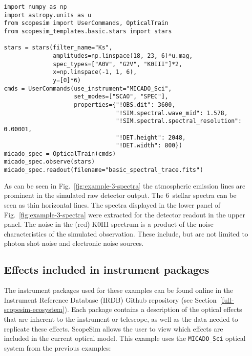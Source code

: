 \begin{lstlisting}[frame=single]
import numpy as np
import astropy.units as u
from scopesim import UserCommands, OpticalTrain
from scopesim_templates.basic.stars import stars

stars = stars(filter_name="Ks",
              amplitudes=np.linspace(18, 23, 6)*u.mag,
              spec_types=["A0V", "G2V", "K0III"]*2,
              x=np.linspace(-1, 1, 6),
              y=[0]*6)
cmds = UserCommands(use_instrument="MICADO_Sci",
                    set_modes=["SCAO", "SPEC"],
                    properties={"!OBS.dit": 3600,
                                "!SIM.spectral.wave_mid": 1.578,
                                "!SIM.spectral.spectral_resolution": 0.00001,
                                "!DET.height": 2048,
                                "!DET.width": 800})
micado_spec = OpticalTrain(cmds)
micado_spec.observe(stars)
micado_spec.readout(filename="basic_spectral_trace.fits")
\end{lstlisting}

As can be seen in Fig.~\ref{fig:example-3-spectra} the atmospheric emission lines are prominent in the simulated raw detector output.
The 6~stellar spectra can be seen as thin horizontal lines.
The spectra displayed in the lower panel of Fig.~\ref{fig:example-3-spectra} were extracted for the detector readout in the upper panel.
The noise in the (red) K0III spectrum is a product of the noise characteristics of the simulated observation.
These include, but are not limited to photon shot noise and electronic noise sources.


\subsection{Effects included in instrument packages}
\label{effects-included-in-instrument-packages}

The instrument packages used for these examples can be found online in the Instrument Reference Database (IRDB) Github repository (see Section~\ref{full-scopesim-ecosystem}).
Each package contains a description of the optical effects that are inherent to the instrument or telescope, as well as the data needed to replicate these effects.
ScopeSim allows the user to view which effects are included in the current optical model.
This example uses the \lstinline{MICADO_Sci} optical system from the previous examples:

